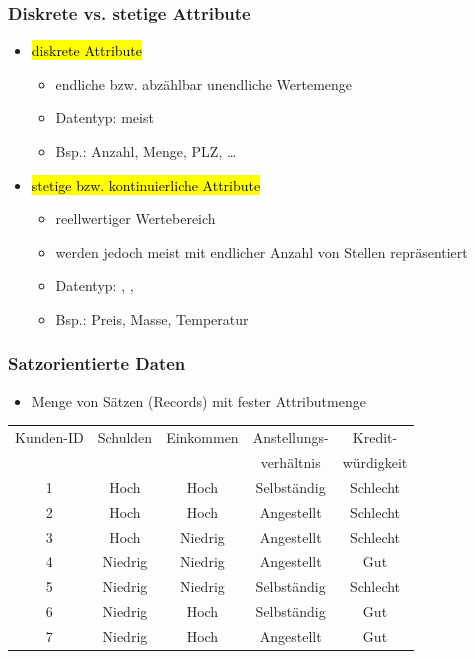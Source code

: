 
\begin{frame}
\frametitle{Diskrete vs. stetige Attribute}

\begin{itemize}
\item \hl{diskrete Attribute}
\begin{itemize}
\item endliche bzw. abzählbar unendliche Wertemenge
\item Datentyp: meist 
\item Bsp.: Anzahl, Menge, PLZ, \dots
\end{itemize}
\item \hl{stetige bzw. kontinuierliche Attribute}
\begin{itemize}
\item reellwertiger Wertebereich
\item werden jedoch meist mit endlicher Anzahl von Stellen repräsentiert
\item Datentyp: , , 
\item Bsp.: Preis, Masse, Temperatur
\end{itemize}
\end{itemize}

\end{frame}



\begin{frame}
\frametitle{Satzorientierte Daten}

\begin{itemize}
\item Menge von Sätzen (Records) mit fester Attributmenge
\end{itemize}

{\small
\begin{tabular}{|c|c|c|c|c|}
\hline
\rowcolor{Gray} Kunden-ID & Schulden & Einkommen & Anstellungs- & Kredit- \\
\rowcolor{Gray}           &           &            & verhältnis   & würdigkeit \\
\hline\hline
1 & Hoch & Hoch & Selbständig & Schlecht \\
2 & Hoch & Hoch & Angestellt & Schlecht \\
3 & Hoch & Niedrig & Angestellt & Schlecht \\
4 & Niedrig & Niedrig & Angestellt & Gut \\
5 & Niedrig & Niedrig & Selbständig & Schlecht \\
6 & Niedrig & Hoch & Selbständig & Gut \\
7 & Niedrig & Hoch & Angestellt & Gut \\
\hline
\end{tabular}}

\end{frame}

